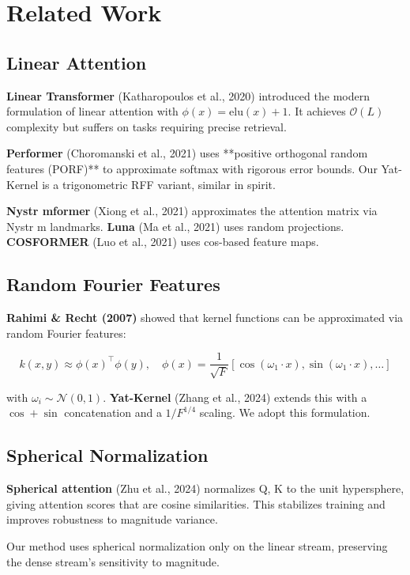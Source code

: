 \section{Related Work}

\subsection{Linear Attention}

\textbf{Linear Transformer} (Katharopoulos et al., 2020) introduced the modern 
formulation of linear attention with $\phi(x) = \text{elu}(x) + 1$. It 
achieves $\mathcal{O}(L)$ complexity but suffers on tasks requiring precise 
retrieval.

\textbf{Performer} (Choromanski et al., 2021) uses **positive orthogonal random 
features (PORF)** to approximate softmax with rigorous error bounds. Our 
Yat-Kernel is a trigonometric RFF variant, similar in spirit.

\textbf{Nystr mformer} (Xiong et al., 2021) approximates the attention matrix 
via Nystr m landmarks. \textbf{Luna} (Ma et al., 2021) uses random projections. 
\textbf{COSFORMER} (Luo et al., 2021) uses cos-based feature maps.

\subsection{Random Fourier Features}

\textbf{Rahimi \& Recht (2007)} showed that kernel functions can be approximated 
via random Fourier features:

\[
k(x, y) \approx \phi(x)^\top \phi(y), \quad
\phi(x) = \frac{1}{\sqrt{F}} \left[ \cos(\omega_1 \cdot x), \sin(\omega_1 \cdot x), \dots \right]
\]

with $\omega_i \sim \mathcal{N}(0, 1)$. \textbf{Yat-Kernel} (Zhang et al., 2024) 
extends this with a $\cos + \sin$ concatenation and a $1/F^{1/4}$ scaling. 
We adopt this formulation.

\subsection{Spherical Normalization}

\textbf{Spherical attention} (Zhu et al., 2024) normalizes Q, K to the unit 
hypersphere, giving attention scores that are cosine similarities. This 
stabilizes training and improves robustness to magnitude variance.

Our method uses spherical normalization only on the linear stream, 
preserving the dense stream's sensitivity to magnitude.

